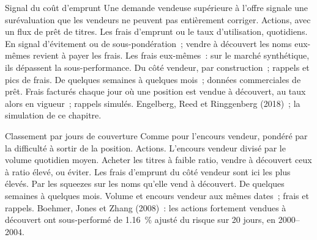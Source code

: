 \begin{strategyfile}{Signal du coût d'emprunt}\label{strat:s1:short-interest-borrow-and-crowding:fee}
 Une demande vendeuse supérieure à l'offre signale une surévaluation que les vendeurs ne peuvent pas entièrement corriger.
 Actions, avec un flux de prêt de titres.
 Les frais d'emprunt ou le taux d'utilisation, quotidiens.
 En signal d'évitement ou de sous-pondération~; vendre à découvert les noms eux-mêmes revient à payer les frais.
 Les frais eux-mêmes~: sur le marché synthétique, ils dépassent la sous-performance.
 Du côté vendeur, par construction~; rappels et pics de frais.
 De quelques semaines à quelques mois~; données commerciales de prêt.
 Frais facturés chaque jour où une position est vendue à découvert, au taux alors en vigueur~; rappels simulés.
 Engelberg, Reed et Ringgenberg (2018)~; la simulation de ce chapitre.
\end{strategyfile}

\begin{strategyfile}{Classement par jours de couverture}\label{strat:s1:short-interest-borrow-and-crowding:dtc}
 Comme pour l'encours vendeur, pondéré par la difficulté à sortir de la position.
 Actions.
 L'encours vendeur divisé par le volume quotidien moyen.
 Acheter les titres à faible ratio, vendre à découvert ceux à ratio élevé, ou éviter.
 Les frais d'emprunt du côté vendeur sont ici les plus élevés.
 Par les squeezes sur les noms qu'elle vend à découvert.
 De quelques semaines à quelques mois.
 Volume et encours vendeur aux mêmes dates~; frais et rappels.
 Boehmer, Jones et Zhang (2008)~: les actions fortement vendues à découvert ont sous-performé de 1.16~\% ajusté du risque sur 20 jours, en 2000--2004.
\end{strategyfile}

